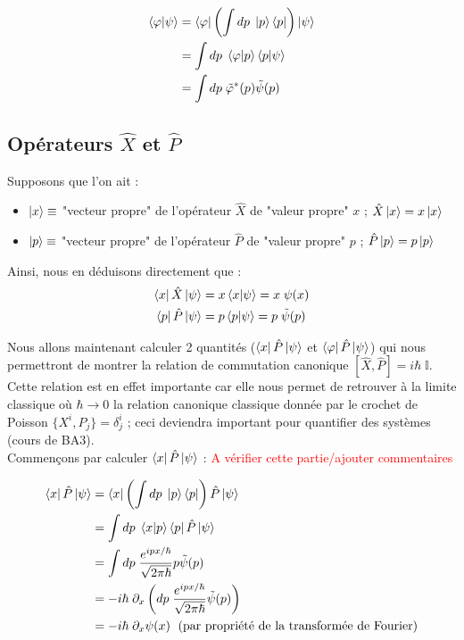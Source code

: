 \documentclass{article}
\begin{document}
\begin{align}
        \braket{\varphi | \psi} &= \bra{\varphi} \left( \int dp \; \ket{p}\bra{p} \right) \ket{\psi} \\
        &= \int dp \; \braket{\varphi |p}\braket{p|\psi} \\
        &= \int dp \; \tilde{\varphi}^*(p)\tilde{\psi}(p)
\end{align}

\subsection*{Opérateurs $\hat{X}$ et $\hat{P}$}

Supposons que l'on ait : \begin{itemize}[label=\textbullet]
    \item $\ket{x} \equiv$ "vecteur propre" de l'opérateur $\hat{X}$ de "valeur propre" $x$ ; $\hat{X}\ket{x} = x\ket{x}$
    \item $\ket{p} \equiv$ "vecteur propre" de l'opérateur $\hat{P}$ de "valeur propre" $p$ ; $\hat{P}\ket{p} = p\ket{p}$
\end{itemize}

Ainsi, nous en déduisons directement que : 
\begin{align}
    \bra{x}\hat{X}\ket{\psi} &= x \braket{x|\psi} = x \; \psi(x) \\
    \bra{p}\hat{P}\ket{\psi} &= p \braket{p|\psi} = p \; \tilde{\psi}(p) \\
\end{align}

Nous allons maintenant calculer 2 quantités ($\bra{x}\hat{P}\ket{\psi}$ et $\bra{\varphi} \hat{P} \ket{\psi}$) qui nous permettront de montrer la relation de commutation canonique $[ \hat{X}, \hat{P}] = i\hbar \; \mathbb{I}$. Cette relation est en effet importante car elle nous permet de retrouver à la limite classique où $\hbar \rightarrow 0$ la relation canonique classique donnée par le crochet de Poisson $\{ X^i,P_j \} = \delta^i_j$ ; ceci deviendra important pour quantifier des systèmes (cours de BA3). \\
Commençons par calculer $\bra{x}\hat{P}\ket{\psi}$ : \textcolor{red}{A vérifier cette partie/ajouter commentaires}

\begin{align}
    \bra{x}\hat{P}\ket{\psi} &= \bra{x} \left( \int dp \; \ket{p} \bra{p} \right) \hat{P} \ket{\psi} \notag \\
    &= \int dp \; \braket{x|p} \bra{p}\hat{P}\ket{\psi} \notag \\
    &= \int dp \; \frac{e^{ipx/\hbar}}{\sqrt{2\pi \hbar}} p \tilde{\psi}(p) \notag \\
    &= -i \hbar \; \partial_x \left( dp \; \frac{e^{ipx/\hbar}}{\sqrt{2 \pi \hbar}} \tilde{\psi}(p) \right) \notag \\
    &= -i \hbar \; \partial_x \psi(x) \; \mbox{ (par propriété de la transformée de Fourier)}
\end{align}
\end{document}
